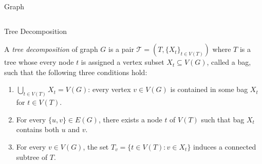 \documentclass[11pt,t, usenames, dvipsnames]{beamer}
\newcommand{\T}{\mathcal{T}}
\begin{document}
\begin{frame}{Graph}
\begin{columns}[c]
\begin{column}{0.4\textwidth}
    \end{column}
    \end{columns}
\end{frame}

\begin{frame}{Tree Decomposition}
    \begin{definition}
        A \textit{tree decomposition} of graph $G$ is a pair $\T=(T, \{X_t\}_{t \in V(T)})$ where $T$ is a tree whose every node $t$ is assigned a vertex subset $X_t \subseteq V(G)$, called a bag, such that the following three conditions hold:
        \begin{enumerate}
            \item $\bigcup_{t \in V(T)} X_t = V(G)$: every vertex $v \in V(G)$ is contained in some bag $X_t$ for $t \in V(T)$.
            \item For every $\{u,v\} \in E(G)$, there exists a node $t$ of $V(T)$ such that bag $X_t$ contains both $u$ and $v$.
            \item For every $v \in V(G)$, the set $T_v = \{t \in V(T) : v \in X_t\}$ induces a connected subtree of $T$.
        \end{enumerate}
    \end{definition}
\end{frame}
\end{document}
